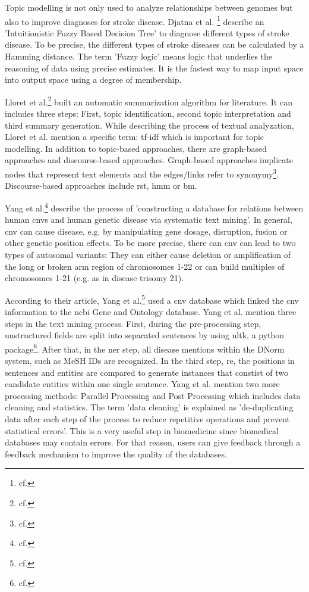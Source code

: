 Topic modelling is not only used to analyze relationships between genomes but also to improve diagnoses for stroke disease. Djatna et al. \footnote{cf.\autocite{djatna_2018}} describe an 'Intuitionistic Fuzzy Based Decision Tree' to diagnose different types of stroke disease. To be precise, the different types of stroke diseases can be calculated by a Hamming distance. The term 'Fuzzy logic' means logic that underlies the reasoning of data using precise estimates. It is the fastest way to map input space into output space using a degree of membership.

Lloret et al.\footnote{cf.\autocite{lloret_2012}} built an automatic summarization algorithm for literature. It can includes three steps: First, topic identification, second topic interpretation and third summary generation. While describing the process of textual analyzation, Lloret et al. mention a specific term: \ac{tf-idf} which is important for topic modelling. In addition to topic-based approaches, there are graph-based approaches and discourse-based approaches. Graph-based approaches implicate nodes that represent text elements and the edges/links refer to synonymy\footnote{cf.\autocite{lloret_2012}}. Discourse-based approaches include \ac{rst}, \ac{hmm} or \ac{bm}. 

Yang et al.\footnote{cf.\autocite{yang_2018}} describe the process of 'constructing a database for relations between human \ac{cnv}s and human genetic disease via systematic text mining'. In general, \ac{cnv} can cause disease, e.g. by manipulating gene dosage, disruption, fusion or other genetic position effects. 
To be more precise, there can \ac{cnv} can lead to two types of autosomal variants: They can either cause deletion or amplification of the long or broken arm region of chromosomes 1-22 or can build multiples of chromosomes 1-21 (e.g. as in disease trisomy 21). 

According to their article, Yang et al.\footnote{cf.\autocite{yang_2018}} used a \ac{cnv} database which linked the \ac{cnv} information to the \ac{ncbi} Gene and Ontology database. Yang et al. mention three steps in the text mining process. First, during the pre-processing step, unstructured fields are split into separated sentences by using \ac{nltk}, a python package\footnote{cf.\autocite{nltk}}. After that, in the \ac{ner} step, all disease mentions within the DNorm system, such as MeSH IDs are recognized. In the third step, \ac{re}, the positions in sentences and entities are compared to generate instances that constist of two candidate entities within one single sentence.
Yang et al. mention two more processing methods: Parallel Processing and Post Processing which includes data cleaning and statistics. The term 'data cleaning' is explained as 'de-duplicating data after each step of the process to reduce repetitive operations and prevent statistical errors'. This is a very useful step in biomedicine since biomedical databases may contain errors. For that reason, users can give feedback through a feedback mechanism to improve the quality of the databases.

